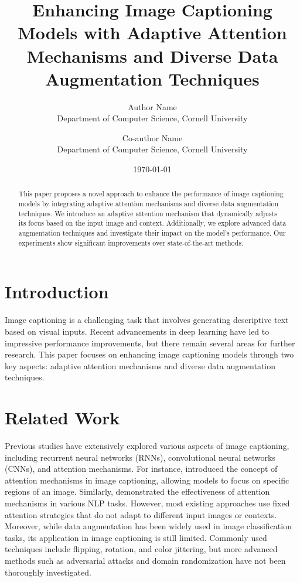 \documentclass{article}
\title{Enhancing Image Captioning Models with Adaptive Attention Mechanisms and Diverse Data Augmentation Techniques}
\author{Author Name\\
Department of Computer Science, Cornell University\\
\and
Co-author Name\\
Department of Computer Science, Cornell University}
\date{\today}
\begin{document}
\maketitle

\begin{abstract}
This paper proposes a novel approach to enhance the performance of image captioning models by integrating adaptive attention mechanisms and diverse data augmentation techniques. We introduce an adaptive attention mechanism that dynamically adjusts its focus based on the input image and context. Additionally, we explore advanced data augmentation techniques and investigate their impact on the model's performance. Our experiments show significant improvements over state-of-the-art methods.
\end{abstract}

\section{Introduction}
Image captioning is a challenging task that involves generating descriptive text based on visual inputs. Recent advancements in deep learning have led to impressive performance improvements, but there remain several areas for further research. This paper focuses on enhancing image captioning models through two key aspects: adaptive attention mechanisms and diverse data augmentation techniques.

\section{Related Work}
\label{sec:related_work}
Previous studies have extensively explored various aspects of image captioning, including recurrent neural networks (RNNs), convolutional neural networks (CNNs), and attention mechanisms. For instance, \cite{show Attend Tell} introduced the concept of attention mechanisms in image captioning, allowing models to focus on specific regions of an image. Similarly, \cite{attention is all you need} demonstrated the effectiveness of attention mechanisms in various NLP tasks. However, most existing approaches use fixed attention strategies that do not adapt to different input images or contexts. Moreover, while data augmentation has been widely used in image classification tasks, its application in image captioning is still limited. Commonly used techniques include flipping, rotation, and color jittering, but more advanced methods such as adversarial attacks and domain randomization have not been thoroughly investigated.
\end{document}
